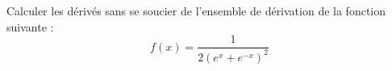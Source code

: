 \documentclass[a4paper,fleqn]{article}
\date{\today}
\begin{document}
Calculer les dérivés sans se soucier de l'ensemble de dérivation de la fonction suivante :
$$ f(x) = \frac{1}{2(e^x+e^{-x})^2} $$
\end{document}
